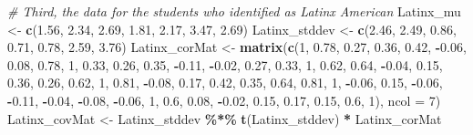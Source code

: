 \documentclass[
  11pt,
]{book}
\newenvironment{Shaded}{\begin{snugshade}}{\end{snugshade}}
\newcommand{\AttributeTok}[1]{\textcolor[rgb]{0.27,0.27,0.27}{#1}}
\newcommand{\CommentTok}[1]{\textcolor[rgb]{0.37,0.37,0.37}{\textit{#1}}}
\newcommand{\DecValTok}[1]{\textcolor[rgb]{0.06,0.06,0.06}{#1}}
\newcommand{\FloatTok}[1]{\textcolor[rgb]{0.06,0.06,0.06}{#1}}
\newcommand{\FunctionTok}[1]{\textcolor[rgb]{0.27,0.27,0.27}{\textbf{#1}}}
\newcommand{\NormalTok}[1]{#1}
\newcommand{\OtherTok}[1]{\textcolor[rgb]{0.37,0.37,0.37}{#1}}
\newcommand{\SpecialCharTok}[1]{\textcolor[rgb]{0.43,0.43,0.43}{\textbf{#1}}}
\begin{document}
\begin{Shaded}
\begin{Highlighting}[]
\CommentTok{\# Third, the data for the students who identified as Latinx American}
\NormalTok{Latinx\_mu }\OtherTok{\textless{}{-}} \FunctionTok{c}\NormalTok{(}\FloatTok{1.56}\NormalTok{, }\FloatTok{2.34}\NormalTok{, }\FloatTok{2.69}\NormalTok{, }\FloatTok{1.81}\NormalTok{, }\FloatTok{2.17}\NormalTok{, }\FloatTok{3.47}\NormalTok{, }\FloatTok{2.69}\NormalTok{)}
\NormalTok{Latinx\_stddev }\OtherTok{\textless{}{-}} \FunctionTok{c}\NormalTok{(}\FloatTok{2.46}\NormalTok{, }\FloatTok{2.49}\NormalTok{, }\FloatTok{0.86}\NormalTok{, }\FloatTok{0.71}\NormalTok{, }\FloatTok{0.78}\NormalTok{, }\FloatTok{2.59}\NormalTok{, }\FloatTok{3.76}\NormalTok{)}
\NormalTok{Latinx\_corMat }\OtherTok{\textless{}{-}} \FunctionTok{matrix}\NormalTok{(}\FunctionTok{c}\NormalTok{(}\DecValTok{1}\NormalTok{, }\FloatTok{0.78}\NormalTok{, }\FloatTok{0.27}\NormalTok{, }\FloatTok{0.36}\NormalTok{, }\FloatTok{0.42}\NormalTok{, }\SpecialCharTok{{-}}\FloatTok{0.06}\NormalTok{, }\FloatTok{0.08}\NormalTok{, }\FloatTok{0.78}\NormalTok{,}
    \DecValTok{1}\NormalTok{, }\FloatTok{0.33}\NormalTok{, }\FloatTok{0.26}\NormalTok{, }\FloatTok{0.35}\NormalTok{, }\SpecialCharTok{{-}}\FloatTok{0.11}\NormalTok{, }\SpecialCharTok{{-}}\FloatTok{0.02}\NormalTok{, }\FloatTok{0.27}\NormalTok{, }\FloatTok{0.33}\NormalTok{, }\DecValTok{1}\NormalTok{, }\FloatTok{0.62}\NormalTok{, }\FloatTok{0.64}\NormalTok{, }\SpecialCharTok{{-}}\FloatTok{0.04}\NormalTok{,}
    \FloatTok{0.15}\NormalTok{, }\FloatTok{0.36}\NormalTok{, }\FloatTok{0.26}\NormalTok{, }\FloatTok{0.62}\NormalTok{, }\DecValTok{1}\NormalTok{, }\FloatTok{0.81}\NormalTok{, }\SpecialCharTok{{-}}\FloatTok{0.08}\NormalTok{, }\FloatTok{0.17}\NormalTok{, }\FloatTok{0.42}\NormalTok{, }\FloatTok{0.35}\NormalTok{, }\FloatTok{0.64}\NormalTok{, }\FloatTok{0.81}\NormalTok{,}
    \DecValTok{1}\NormalTok{, }\SpecialCharTok{{-}}\FloatTok{0.06}\NormalTok{, }\FloatTok{0.15}\NormalTok{, }\SpecialCharTok{{-}}\FloatTok{0.06}\NormalTok{, }\SpecialCharTok{{-}}\FloatTok{0.11}\NormalTok{, }\SpecialCharTok{{-}}\FloatTok{0.04}\NormalTok{, }\SpecialCharTok{{-}}\FloatTok{0.08}\NormalTok{, }\SpecialCharTok{{-}}\FloatTok{0.06}\NormalTok{, }\DecValTok{1}\NormalTok{, }\FloatTok{0.6}\NormalTok{, }\FloatTok{0.08}\NormalTok{, }\SpecialCharTok{{-}}\FloatTok{0.02}\NormalTok{,}
    \FloatTok{0.15}\NormalTok{, }\FloatTok{0.17}\NormalTok{, }\FloatTok{0.15}\NormalTok{, }\FloatTok{0.6}\NormalTok{, }\DecValTok{1}\NormalTok{), }\AttributeTok{ncol =} \DecValTok{7}\NormalTok{)}
\NormalTok{Latinx\_covMat }\OtherTok{\textless{}{-}}\NormalTok{ Latinx\_stddev }\SpecialCharTok{\%*\%} \FunctionTok{t}\NormalTok{(Latinx\_stddev) }\SpecialCharTok{*}\NormalTok{ Latinx\_corMat}

\end{Highlighting}
\end{Shaded}
\end{document}
